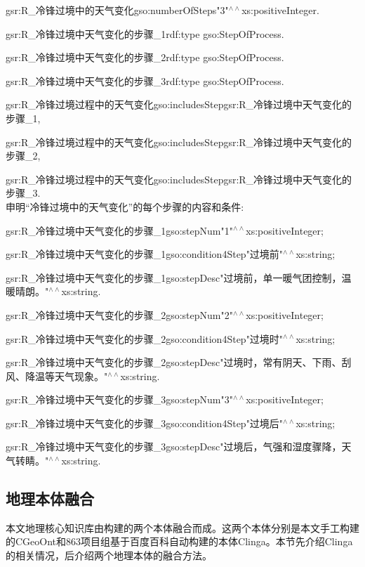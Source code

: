 gsr:R\_冷锋过境中的天气变化\quad gso:numberOfSteps\quad "3"$^{\land\land}$xs:positiveInteger\quad .

gsr:R\_冷锋过境中天气变化的步骤\_1\quad rdf:type \quad gso:StepOfProcess\quad .

gsr:R\_冷锋过境中天气变化的步骤\_2\quad rdf:type \quad gso:StepOfProcess\quad .

gsr:R\_冷锋过境中天气变化的步骤\_3\quad rdf:type \quad gso:StepOfProcess\quad .

gsr:R\_冷锋过境过程中的天气变化\quad gso:includesStep\quad gsr:R\_冷锋过境中天气变化的步骤\_1\quad ,\quad 

gsr:R\_冷锋过境过程中的天气变化\quad gso:includesStep\quad gsr:R\_冷锋过境中天气变化的步骤\_2\quad ,\quad 

gsr:R\_冷锋过境过程中的天气变化\quad gso:includesStep\quad gsr:R\_冷锋过境中天气变化的步骤\_3\quad .
\\
申明“冷锋过境中的天气变化”的每个步骤的内容和条件:

gsr:R\_冷锋过境中天气变化的步骤\_1\quad gso:stepNum\quad "1"$^{\land\land}$xs:positiveInteger\quad ;

gsr:R\_冷锋过境中天气变化的步骤\_1\quad gso:condition4Step\quad "过境前"$^{\land\land}$xs:string\quad ;

gsr:R\_冷锋过境中天气变化的步骤\_1\quad gso:stepDesc\quad "过境前，单一暖气团控制，温暖晴朗。"$^{\land\land}$xs:string\quad .

gsr:R\_冷锋过境中天气变化的步骤\_2\quad gso:stepNum\quad "2"$^{\land\land}$xs:positiveInteger\quad ;

gsr:R\_冷锋过境中天气变化的步骤\_2\quad gso:condition4Step\quad "过境时"$^{\land\land}$xs:string\quad ;

gsr:R\_冷锋过境中天气变化的步骤\_2\quad gso:stepDesc\quad "过境时，常有阴天、下雨、刮风、降温等天气现象。"$^{\land\land}$xs:string\quad .

gsr:R\_冷锋过境中天气变化的步骤\_3\quad gso:stepNum\quad "3"$^{\land\land}$xs:positiveInteger\quad ;

gsr:R\_冷锋过境中天气变化的步骤\_3\quad gso:condition4Step\quad "过境后"$^{\land\land}$xs:string\quad ;

gsr:R\_冷锋过境中天气变化的步骤\_3\quad gso:stepDesc\quad "过境后，气强和湿度骤降，天气转睛。"$^{\land\land}$xs:string\quad .

\subsection{地理本体融合}
本文地理核心知识库由构建的两个本体融合而成。这两个本体分别是本文手工构建的CGeoOnt和863项目组基于百度百科自动构建的本体Clinga。本节先介绍Clinga的相关情况，后介绍两个地理本体的融合方法。

